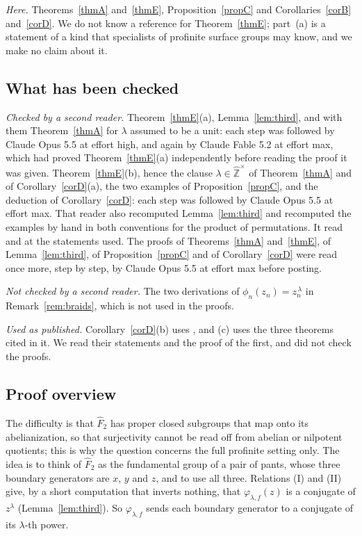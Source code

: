 \documentclass[11pt]{amsart}
\theoremstyle{definition}
\theoremstyle{remark}
\newcommand{\Zh}{\widehat{\mathbb Z}}
\newcommand{\Fh}{\widehat F}
\newcommand{\ph}{\varphi}
\begin{document}
\emph{Here.} Theorems~\ref{thmA} and~\ref{thmE}, Proposition~\ref{propC} and Corollaries~\ref{corB} and~\ref{corD}. We do not know a reference for Theorem~\ref{thmE}; part~(a) is a statement of a kind that specialists of profinite surface groups may know, and we make no claim about it.

\subsection{What has been checked}\label{sec:checked}
\emph{Checked by a second reader.} Theorem~\ref{thmE}(a), Lemma~\ref{lem:third}, and with them Theorem~\ref{thmA} for $\lambda$ assumed to be a unit: each step was followed by Claude Opus 5.5 at effort high, and again by Claude Fable 5.2 at effort max, which had proved Theorem~\ref{thmE}(a) independently before reading the proof it was given. Theorem~\ref{thmE}(b), hence the clause $\lambda\in\Zh^\times$ of Theorem~\ref{thmA} and of Corollary~\ref{corD}(a), the two examples of Proposition~\ref{propC}, and the deduction of Corollary~\ref{corD}: each step was followed by Claude Opus 5.5 at effort max. That reader also recomputed Lemma~\ref{lem:third} and recomputed the examples by hand in both conventions for the product of permutations. It read \cite[Definition~7.1, Theorem~7.2, Proposition~7.4, Lemma~7.5, Theorem~8.4]{Hor} and \cite[Definition~7.2, Proposition~7.3, Theorems~8.4 and~11.1]{BHR} at the statements used. The proofs of Theorems~\ref{thmA} and~\ref{thmE}, of Lemma~\ref{lem:third}, of Proposition~\ref{propC} and of Corollary~\ref{corD} were read once more, step by step, by Claude Opus 5.5 at effort max before posting.

\emph{Not checked by a second reader.} The two derivations of $\phi_n(z_n)=z_n^{\,\lambda}$ in Remark~\ref{rem:braids}, which is not used in the proofs.

\emph{Used as published.} Corollary~\ref{corD}(b) uses \cite[Proposition~7.3]{BHR}, and (c) uses the three theorems cited in it. We read their statements and the proof of the first, and did not check the proofs.

\subsection{Proof overview}\label{sec:overview}
The difficulty is that $\Fh_2$ has proper closed subgroups that map onto its abelianization, so that surjectivity cannot be read off from abelian or nilpotent quotients; this is why the question concerns the full profinite setting only. The idea is to think of $\Fh_2$ as the fundamental group of a pair of pants, whose three boundary generators are $x$, $y$ and $z$, and to use all three. Relations (I) and (II) give, by a short computation that inverts nothing, that $\ph_{\lambda,f}(z)$ is a conjugate of $z^\lambda$ (Lemma~\ref{lem:third}). So $\ph_{\lambda,f}$ sends each boundary generator to a conjugate of its $\lambda$-th power.
\end{document}
